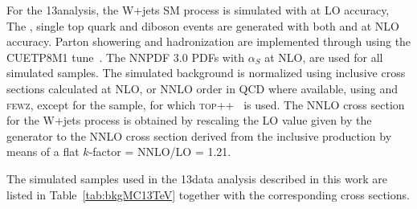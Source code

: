 For the 13\TeV analysis, the W+jets SM process is simulated with \amcatnlo{} at LO accuracy,
The \ttbar, single top quark and diboson events are generated with both \POWHEG{} and \amcatnlo{} at NLO accuracy.
Parton showering and hadronization are implemented through  using the CUETP8M1 tune~\cite{Skands:2014pea,Khachatryan:2015pea}.
The NNPDF 3.0 PDFs with $\alpha_S$ at NLO, are used for all simulated samples. 
The simulated background is normalized using inclusive cross sections calculated at NLO, or NNLO order in QCD where available, using \MCFM{} and \textsc{fewz},
except for the \ttbar sample, for which \textsc{top++}~\cite{Czakon:2011xx} is used.
The NNLO cross section for the W+jets process is obtained by rescaling the LO value given by the generator to the NNLO cross section
derived from the inclusive production by means of a flat $k$-factor = NNLO/LO = 1.21.

The simulated samples used in the 13\TeV data analysis described in this work are listed in Table~\ref{tab:bkgMC13TeV} together with the corresponding cross sections.

